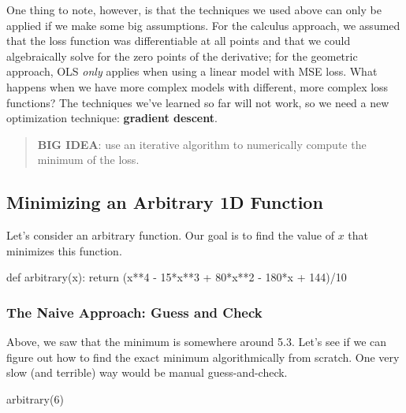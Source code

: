 \documentclass[
  letterpaper,
  DIV=11,
  numbers=noendperiod]{scrreprt}
\newenvironment{Shaded}{\begin{snugshade}}{\end{snugshade}}
\newcommand{\ControlFlowTok}[1]{\textcolor[rgb]{0.00,0.23,0.31}{#1}}
\newcommand{\DecValTok}[1]{\textcolor[rgb]{0.68,0.00,0.00}{#1}}
\newcommand{\KeywordTok}[1]{\textcolor[rgb]{0.00,0.23,0.31}{#1}}
\newcommand{\NormalTok}[1]{\textcolor[rgb]{0.00,0.23,0.31}{#1}}
\newcommand{\OperatorTok}[1]{\textcolor[rgb]{0.37,0.37,0.37}{#1}}
\begin{document}
One thing to note, however, is that the techniques we used above can
only be applied if we make some big assumptions. For the calculus
approach, we assumed that the loss function was differentiable at all
points and that we could algebraically solve for the zero points of the
derivative; for the geometric approach, OLS \emph{only} applies when
using a linear model with MSE loss. What happens when we have more
complex models with different, more complex loss functions? The
techniques we've learned so far will not work, so we need a new
optimization technique: \textbf{gradient descent}.

\begin{quote}
\textbf{BIG IDEA}: use an iterative algorithm to numerically compute the
minimum of the loss.
\end{quote}

\subsection{Minimizing an Arbitrary 1D
Function}\label{minimizing-an-arbitrary-1d-function}

Let's consider an arbitrary function. Our goal is to find the value of
\(x\) that minimizes this function.

\begin{Shaded}
\begin{Highlighting}[]
\KeywordTok{def}\NormalTok{ arbitrary(x):}
    \ControlFlowTok{return}\NormalTok{ (x}\OperatorTok{**}\DecValTok{4} \OperatorTok{{-}} \DecValTok{15}\OperatorTok{*}\NormalTok{x}\OperatorTok{**}\DecValTok{3} \OperatorTok{+} \DecValTok{80}\OperatorTok{*}\NormalTok{x}\OperatorTok{**}\DecValTok{2} \OperatorTok{{-}} \DecValTok{180}\OperatorTok{*}\NormalTok{x }\OperatorTok{+} \DecValTok{144}\NormalTok{)}\OperatorTok{/}\DecValTok{10}
\end{Highlighting}
\end{Shaded}

\subsubsection{The Naive Approach: Guess and
Check}\label{the-naive-approach-guess-and-check}

Above, we saw that the minimum is somewhere around 5.3. Let's see if we
can figure out how to find the exact minimum algorithmically from
scratch. One very slow (and terrible) way would be manual
guess-and-check.

\begin{Shaded}
\begin{Highlighting}[]
\NormalTok{arbitrary(}\DecValTok{6}\NormalTok{)}
\end{Highlighting}
\end{Shaded}
\end{document}
